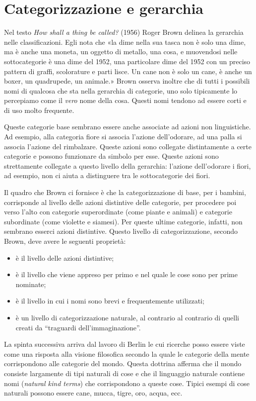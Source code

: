 \section{Categorizzazione e gerarchia}
Nel testo \emph{How shall a thing be called?} (1956) Roger Brown delinea la gerarchia nelle classificazioni. Egli nota che «la dime nella sua tasca non è solo una dime, ma è anche una moneta, un oggetto di metallo, una cosa, e muovendosi nelle sottocategorie è una dime del 1952, una particolare dime del 1952 con un preciso pattern di graffi, scolorature e parti lisce. Un cane non è solo un cane, è anche un boxer, un quadrupede, un animale.» Brown osserva inoltre che di tutti i possibili nomi di qualcosa che sta nella gerarchia di categorie, uno solo tipicamente lo percepiamo come il \emph{vero} nome della cosa. Questi nomi tendono ad essere corti e di uso molto frequente.

Queste categorie base sembrano essere anche associate ad azioni non linguistiche. Ad esempio, alla categoria fiore si associa l’azione dell’odorare, ad una palla si associa l’azione del rimbalzare. Queste azioni sono collegate distintamente a certe categorie e possono funzionare da simbolo per esse. Queste azioni sono strettamente collegate a questo livello della gerarchia: l’azione dell’odorare i fiori, ad esempio, non ci aiuta a distinguere tra le sottocategorie dei fiori.

Il quadro che Brown ci fornisce è che la categorizzazione di base, per i bambini, corrisponde al livello delle azioni distintive delle categorie, per procedere poi verso l’alto con categorie superordinate (come piante e animali) e categorie subordinate (come violette e siamesi). Per queste ultime categorie, infatti, non sembrano esserci azioni distintive. Questo livello di categorizzazione, secondo Brown, deve avere le seguenti proprietà:
\begin{itemize}
  \item è il livello delle azioni distintive;
  \item è il livello che viene appreso per primo e nel quale le cose sono per prime nominate;
  \item è il livello in cui i nomi sono brevi e frequentemente utilizzati;
  \item è un livello di categorizzazione naturale, al contrario al contrario di quelli creati da ``traguardi dell’immaginazione''.
\end{itemize}

La spinta successiva arriva dal lavoro di Berlin le cui ricerche posso essere viste come una risposta alla visione filosofica secondo la quale le categorie della mente corrispondono alle categorie del mondo. Questa dottrina afferma che il mondo consiste largamente di tipi naturali di cose e che il linguaggio naturale contiene nomi (\emph{natural kind terms}) che corrispondono a queste cose. Tipici esempi di cose naturali possono essere cane, mucca, tigre, oro, acqua, ecc.

